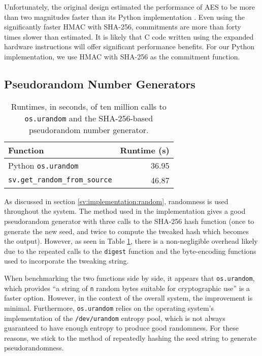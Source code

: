 Unfortunately, the original design estimated the performance of AES to be more than two magnitudes faster than its Python implementation \cite{rrv}. Even using the significantly faster HMAC with SHA-256, commitments are more than forty times slower than estimated. It is likely that C code written using the expanded hardware instructions will offer significant performance benefits. For our Python implementation, we use HMAC with SHA-256 as the commitment function.

\subsection{Pseudorandom Number Generators} \label{perf:crypto:random}

\begin{table}[htbp]
\centering
\begin{tabular}{l | r}
  \textbf{Function} & \textbf{Runtime (s)} \\
  \hline
  Python \texttt{os.urandom} & 36.95 \\
  \texttt{sv.get\_random\_from\_source} & 46.87
\end{tabular}
\caption[Performance measurements of pseudorandom number generators]{Runtimes, in seconds, of ten million calls to \texttt{os.urandom} and the SHA-256-based pseudorandom number generator.}
\label{table:perf:rand}
\end{table}

As discussed in section \ref{sv:implementation:random}, randomness is used throughout the system. The method used in the implementation gives a good pseudorandom generator with three calls to the SHA-256 hash function (once to generate the new seed, and twice to compute the tweaked hash which becomes the output). However, as seen in Table \ref{table:perf:rand}, there is a non-negligible overhead likely due to the repeated calls to the \texttt{digest} function and the byte-encoding functions used to incorporate the tweaking string.

When benchmarking the two functions side by side, it appears that \texttt{os.urandom}, which provides ``a string of \texttt{n} random bytes suitable for cryptographic use'' \cite{python-urandom} is a faster option. However, in the context of the overall system, the improvement is minimal. Furthermore, \texttt{os.urandom} relies on the operating system's implementation of the \texttt{/dev/urandom} entropy pool, which is not always guaranteed to have enough entropy to produce good randomness. For these reasons, we stick to the method of repeatedly hashing the seed string to generate pseudorandomness.

